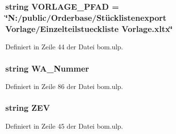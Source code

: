 \subsubsection[{V\+O\+R\+L\+A\+G\+E\+\_\+\+P\+F\+A\+D}]{\setlength{\rightskip}{0pt plus 5cm}string V\+O\+R\+L\+A\+G\+E\+\_\+\+P\+F\+A\+D = \char`\"{}N\+:/public/Orderbase/Stücklistenexport Vorlage/Einzelteilstueckliste Vorlage.\+xltx\char`\"{}}\label{bom_8ulp_a5b14b1eeb65e50d10a438760f173f2e9}


Definiert in Zeile 44 der Datei bom.\+ulp.

\hypertarget{bom_8ulp_a190c864c13eed4946823ed73c1865058}{}
\subsubsection[{W\+A\+\_\+\+Nummer}]{\setlength{\rightskip}{0pt plus 5cm}string W\+A\+\_\+\+Nummer}\label{bom_8ulp_a190c864c13eed4946823ed73c1865058}


Definiert in Zeile 86 der Datei bom.\+ulp.

\hypertarget{bom_8ulp_a0722c36319aaa70ab8b91fc4743b1b99}{}
\subsubsection[{Z\+E\+V}]{\setlength{\rightskip}{0pt plus 5cm}string Z\+E\+V}\label{bom_8ulp_a0722c36319aaa70ab8b91fc4743b1b99}


Definiert in Zeile 45 der Datei bom.\+ulp.

